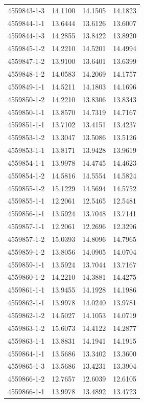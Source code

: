 \begin{longtable}{lrrr}
4559843-1-3 & 14.1100 & 14.1505 & 14.1823 \\
4559844-1-1 & 13.6444 & 13.6126 & 13.6007 \\
4559844-1-3 & 14.2855 & 13.8422 & 13.8920 \\
4559845-1-2 & 14.2210 & 14.5201 & 14.4994 \\
4559847-1-2 & 13.9100 & 13.6401 & 13.6399 \\
4559848-1-2 & 14.0583 & 14.2069 & 14.1757 \\
4559849-1-1 & 14.5211 & 14.1803 & 14.1696 \\
4559850-1-2 & 14.2210 & 13.8306 & 13.8343 \\
4559850-1-1 & 13.8570 & 14.7319 & 14.7167 \\
4559851-1-1 & 13.7102 & 13.4151 & 13.4237 \\
4559853-1-2 & 13.3047 & 13.5086 & 13.5126 \\
4559853-1-1 & 13.8171 & 13.9428 & 13.9619 \\
4559854-1-1 & 13.9978 & 14.4745 & 14.4623 \\
4559854-1-2 & 14.5816 & 14.5554 & 14.5824 \\
4559855-1-2 & 15.1229 & 14.5694 & 14.5752 \\
4559855-1-1 & 12.2061 & 12.5465 & 12.5481 \\
4559856-1-1 & 13.5924 & 13.7048 & 13.7141 \\
4559857-1-1 & 12.2061 & 12.2696 & 12.3296 \\
4559857-1-2 & 15.0393 & 14.8096 & 14.7965 \\
4559859-1-2 & 13.8056 & 14.0905 & 14.0704 \\
4559859-1-1 & 13.5924 & 13.7044 & 13.7167 \\
4559860-1-2 & 14.2210 & 14.3881 & 14.4275 \\
4559861-1-1 & 13.9455 & 14.1928 & 14.1986 \\
4559862-1-1 & 13.9978 & 14.0240 & 13.9781 \\
4559862-1-2 & 14.5027 & 14.1053 & 14.0719 \\
4559863-1-2 & 15.6073 & 14.4122 & 14.2877 \\
4559863-1-1 & 13.8831 & 14.1941 & 14.1915 \\
4559864-1-1 & 13.5686 & 13.3402 & 13.3600 \\
4559865-1-3 & 13.5686 & 13.4231 & 13.3904 \\
4559866-1-2 & 12.7657 & 12.6039 & 12.6105 \\
4559866-1-1 & 13.9978 & 13.4892 & 13.4723 \\

\end{longtable}
